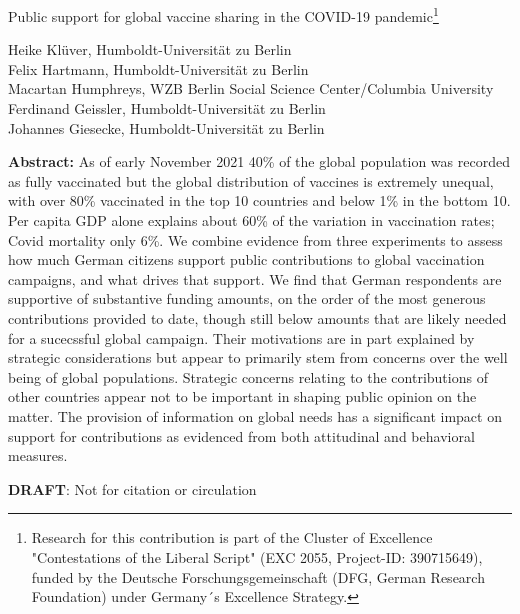 \documentclass[12pt,oneside,smallheadings,chapterprefix=true]{article}
\begin{document}

\setlength{\textwidth}{14.0cm}

\onehalfspacing

\vspace*{0.7cm}
\begin{center}
\begin{huge}
Public support for global vaccine sharing in the COVID-19 pandemic\footnote{Research for this contribution is part of the Cluster of Excellence "Contestations of the Liberal Script" (EXC 2055, Project-ID: 390715649), funded by the Deutsche Forschungsgemeinschaft (DFG, German Research Foundation) under Germany´s Excellence Strategy.}
\end{huge}
\end{center}

\vspace*{0.5cm}

\begin{center}
Heike Klüver, Humboldt-Universität zu Berlin \\
Felix Hartmann, Humboldt-Universität zu Berlin \\ 
Macartan Humphreys, WZB Berlin Social Science Center/Columbia University \\
Ferdinand Geissler, Humboldt-Universität zu Berlin \\
Johannes Giesecke, Humboldt-Universität zu Berlin



\end{center}		
		
\vspace*{1cm}
										
								

\singlespacing
\begin{sloppypar}
\textbf{Abstract:} 
As of early November 2021 40\% of the global population was recorded as fully vaccinated but the global distribution of vaccines is extremely unequal, with over 80\% vaccinated in the top 10 countries and below 1\% in the bottom 10. Per capita GDP alone explains about 60\% of the variation in vaccination rates; Covid mortality only 6\%. We combine evidence from three experiments to assess how much German citizens support public contributions to global vaccination campaigns, and what drives that support. We find that German respondents are supportive of substantive funding amounts, on the order of the most generous contributions provided to date, though still below amounts that are likely needed for a sucecssful global campaign. Their motivations are in part explained by strategic considerations but appear to primarily stem from concerns over the well being of global populations. Strategic concerns relating to the contributions of other countries appear not to be important in shaping public opinion on the matter. The provision of information on global needs has a significant impact on support for contributions as evidenced from both attitudinal and behavioral measures.   

\textbf{DRAFT}: Not for citation or circulation
\end{sloppypar}
\end{document}
